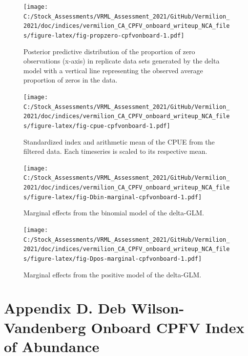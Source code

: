 \documentclass[11pt,
  english,
]{article}
\begin{document}
\begin{figure}
\centering
\texttt{[image: C:/Stock\_Assessments/VRML\_Assessment\_2021/GitHub/Vermilion\_2021/doc/indices/vermilion\_CA\_CPFV\_onboard\_writeup\_NCA\_files/figure-latex/fig-propzero-cpfvonboard-1.pdf]}
\caption{\label{fig:fig-propzero-cpfvonboard}Posterior predictive distribution of the proportion of zero observations (x-axis) in replicate data sets generated by the delta model with a vertical line representing the observed average proportion of zeros in the data.}
\end{figure}

\FloatBarrier

\begin{figure}
\centering
\texttt{[image: C:/Stock\_Assessments/VRML\_Assessment\_2021/GitHub/Vermilion\_2021/doc/indices/vermilion\_CA\_CPFV\_onboard\_writeup\_NCA\_files/figure-latex/fig-cpue-cpfvonboard-1.pdf]}
\caption{\label{fig:fig-cpue-cpfvonboard}Standardized index and arithmetic mean of the CPUE from the filtered data. Each timeseries is scaled to its respective mean.}
\end{figure}

\begin{figure}
\centering
\texttt{[image: C:/Stock\_Assessments/VRML\_Assessment\_2021/GitHub/Vermilion\_2021/doc/indices/vermilion\_CA\_CPFV\_onboard\_writeup\_NCA\_files/figure-latex/fig-Dbin-marginal-cpfvonboard-1.pdf]}
\caption{\label{fig:fig-Dbin-marginal-cpfvonboard}Marginal effects from the binomial model of the delta-GLM.}
\end{figure}

\begin{figure}
\centering
\texttt{[image: C:/Stock\_Assessments/VRML\_Assessment\_2021/GitHub/Vermilion\_2021/doc/indices/vermilion\_CA\_CPFV\_onboard\_writeup\_NCA\_files/figure-latex/fig-Dpos-marginal-cpfvonboard-1.pdf]}
\caption{\label{fig:fig-Dpos-marginal-cpfvonboard}Marginal effects from the positive model of the delta-GLM.}
\end{figure}

\newpage


\hypertarget{appendix-d.-deb-wilson-vandenberg-onboard-cpfv-index-of-abundance}{%
\section*{Appendix D. Deb Wilson-Vandenberg Onboard CPFV Index of Abundance}\label{appendix-d.-deb-wilson-vandenberg-onboard-cpfv-index-of-abundance}}
\end{document}
